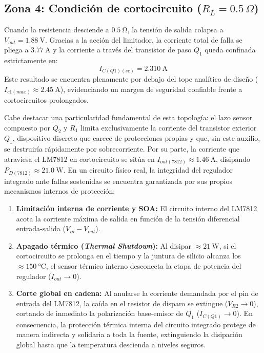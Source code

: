 \subsection{Zona 4: Condición de cortocircuito ($R_L = 0.5\,\Omega$)}
Cuando la resistencia desciende a $\SI{0.5}{\ohm}$, la tensión de salida colapsa a
$V_{out} = \SI{1.88}{\volt}$. Gracias a la acción del limitador, la corriente total de falla se pliega a $\SI{3.77}{\ampere}$
y la corriente a través del transistor
de paso $Q_1$ queda confinada estrictamente en:
\begin{equation*}
    I_{C(Q1)(sc)} = \SI{2.310}{\ampere}
\end{equation*}
Este resultado se encuentra plenamente por debajo del tope analítico de diseño ($I_{c1(max)} \approx \SI{2.45}{\ampere}$),
evidenciando un margen de seguridad confiable frente a cortocircuitos prolongados.

Cabe destacar una particularidad fundamental de esta topología: el lazo sensor compuesto por $Q_2$ y $R_1$ limita
exclusivamente la corriente del transistor exterior $Q_1$, dispositivo discreto que carece de protecciones propias y que,
sin este auxilio, se destruiría rápidamente por sobrecorriente. Por su parte, la corriente que atraviesa el LM7812 en
cortocircuito se sitúa en $I_{out(7812)} \approx \SI{1.46}{\ampere}$, disipando $P_{D(7812)} \approx \SI{21.0}{\watt}$.
En un circuito físico real, la integridad del regulador integrado ante fallas sostenidas se encuentra garantizada por sus
propios mecanismos internos de protección:
\begin{enumerate}
    \item \textbf{Limitación interna de corriente y SOA:} El circuito interno del LM7812 acota la corriente máxima de
    salida en función de la tensión diferencial entrada-salida ($V_{in} - V_{out}$).
    \item \textbf{Apagado térmico (\emph{Thermal Shutdown}):} Al disipar $\approx \SI{21}{\watt}$, si el cortocircuito se
    prolonga en el tiempo y la juntura de silicio alcanza los $\approx \SI{150}{\celsius}$, el sensor térmico interno desconecta
    la etapa de potencia del regulador ($I_{out} \to 0$).
    \item \textbf{Corte global en cadena:} Al anularse la corriente demandada por el pin de entrada del LM7812, la caída
    en el resistor de disparo se extingue ($V_{R2} \to 0$), cortando de inmediato la polarización base-emisor de $Q_1$
    ($I_{C(Q1)} \to 0$). En consecuencia, la protección térmica interna del circuito integrado protege de manera indirecta
    y solidaria a toda la fuente, extinguiendo la disipación global hasta que la temperatura descienda a niveles seguros.
\end{enumerate}


